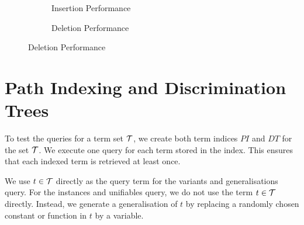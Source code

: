 \begin{figure}[h]
  \begin{subfigure}{0.45\textwidth}
\begin{adjustbox}{width=1\textwidth}
\end{adjustbox}
\caption{Insertion Performance}
\label{pi_insert}
\end{subfigure}
\begin{subfigure}{0.1\textwidth}
\end{subfigure}
\begin{subfigure}{0.45\textwidth}
\begin{adjustbox}{width=1\textwidth}
\end{adjustbox}
\caption{Deletion Performance}
\label{pi_delete}
\end{subfigure}
\end{figure}

\section{Path Indexing and Discrimination Trees} \label{pi_dt}
To test the queries for a term set $\mathcal{T}$, we create both term indices $PI$ and $DT$ for the set $\mathcal{T}$. We execute one query for each term stored in the index. This ensures that each indexed term is retrieved at least once.

We use $t \in \mathcal{T}$ directly as the query term for the variants and generalisations query.
For the instances and unifiables query, we do not use the term $t \in \mathcal{T}$ directly.
Instead, we generate a generalisation of $t$ by replacing a randomly chosen constant or function in $t$ by a variable.

